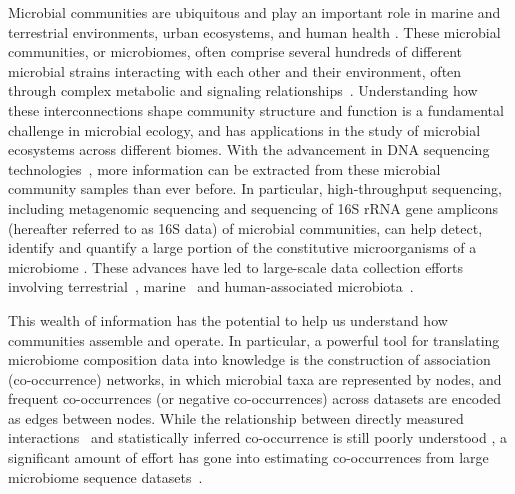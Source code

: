 \documentclass[letterpaper,12pt]{article}
\begin{document}
Microbial communities are ubiquitous and play an important role in marine and terrestrial environments, urban ecosystems, and human health \cite{lima-mendezDeterminantsCommunityStructure2015a,Thompson2017,royo-llonchCompendium530Metagenomeassembled2021,tedersooFungalBiogeographyGlobal2014,dankoGlobalMetagenomicMap2021,mclellanMicrobiomeUrbanWaters2015,HumanMicrobiomeProjectConsortium2012}.
  These microbial communities, or microbiomes, often comprise several hundreds of different microbial strains interacting with each other and their environment, often through complex metabolic and signaling relationships~\cite{zelezniakMetabolicDependenciesDrive2015,Ghoul2016,coyteUnderstandingCompetitionCooperation2019,DSouza2018}.
  Understanding how these interconnections shape community structure and function is a fundamental challenge in microbial ecology, and has applications in the study of microbial ecosystems across different biomes.
  With the advancement in DNA sequencing technologies~\cite{huNextgenerationSequencingTechnologies2021,buermansNextGenerationSequencing2014,Narihiro2017},  more information can be extracted from these microbial community samples than ever before.
  In particular, high-throughput sequencing, including metagenomic sequencing and sequencing of 16S rRNA gene amplicons (hereafter referred to as 16S data) of microbial communities, can help detect, identify and quantify a large portion of the constitutive microorganisms of a microbiome \cite{ju16SRRNAGene2015,Jovel2016,quinceShotgunMetagenomicsSampling2017,sedlarBioinformaticsStrategiesTaxonomy2017}.
  These advances have led to large-scale data collection efforts involving terrestrial~\cite{Thompson2017,gilbertMeetingReportTerabase2010,tedersooFungalBiogeographyGlobal2014}, marine~\cite{lima-mendezDeterminantsCommunityStructure2015a,royo-llonchCompendium530Metagenomeassembled2021} and human-associated microbiota~\cite{HumanMicrobiomeProjectConsortium2012,proctorIntegrativeHumanMicrobiome2019,Lloyd-Price2016}.

 This wealth of information has the potential to help us understand how communities assemble and operate.
 In particular, a powerful tool for translating microbiome composition data into knowledge is the construction of association (co-occurrence) networks, in which  microbial taxa are represented by nodes, and frequent co-occurrences (or negative co-occurrences) across datasets are encoded as edges between nodes.
 While the relationship between directly measured interactions~\cite{lubbeExometabolomicAnalysisCrossFeeding2017,Jian2020,Hsu2019} and statistically inferred co-occurrence is still poorly understood \cite{Zuniga2017,Rottjers2018}, a significant amount of effort has gone into estimating co-occurrences from large microbiome sequence datasets~\cite{faustMicrobialCooccurrenceRelationships2012,leeCrosskingdomCooccurrenceNetworks2022,faustMicrobialInteractionsNetworks2012a,maEarthMicrobialCooccurrence2020a}.
\end{document}
